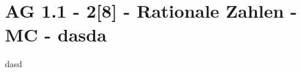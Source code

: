 \section{AG 1.1 - 2[8] - Rationale Zahlen - MC - dasda}

\begin{beispiel}[AG 1.1]{1}
dasd
\end{beispiel}